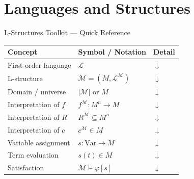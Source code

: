 \section{Languages and Structures}

\begin{toolkitbox}{L-Structures Toolkit --- Quick Reference}
\small
\begin{tabular}{l l l}
\toprule
\textbf{Concept} & \textbf{Symbol / Notation} & \textbf{Detail} \\
\midrule
First-order language    & $\mathcal{L}$                          & \hyperref[def:first-order-language]{$\downarrow$} \\
L-structure             & $\mathcal{M} = (M, \mathcal{L}^{\mathcal{M}})$ & \hyperref[def:l-structure]{$\downarrow$} \\
Domain / universe       & $|\mathcal{M}|$ or $M$                 & \hyperref[def:l-structure]{$\downarrow$} \\
Interpretation of $f$   & $f^{\mathcal{M}} : M^n \to M$          & \hyperref[def:l-structure]{$\downarrow$} \\
Interpretation of $R$   & $R^{\mathcal{M}} \subseteq M^n$        & \hyperref[def:l-structure]{$\downarrow$} \\
Interpretation of $c$   & $c^{\mathcal{M}} \in M$                & \hyperref[def:l-structure]{$\downarrow$} \\
Variable assignment     & $s : \mathrm{Var} \to M$               & \hyperref[def:variable-assignment]{$\downarrow$} \\
Term evaluation         & $s(t) \in M$                           & \hyperref[def:term-evaluation]{$\downarrow$} \\
Satisfaction            & $\mathcal{M} \models \varphi[s]$       & \hyperref[def:satisfaction]{$\downarrow$} \\
\bottomrule
\end{tabular}
\end{toolkitbox}



